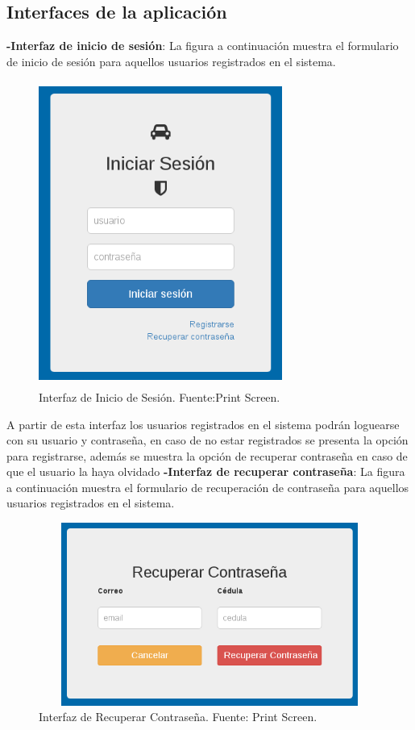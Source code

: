 \subsection{Interfaces de la aplicación}
\setlength{\parskip}{5mm}

\textbf{-Interfaz de inicio de sesión}: La figura a continuación muestra el formulario de inicio de sesión para aquellos usuarios registrados en el sistema.

\begin{figure}[H]
\begin{center}
	\includegraphics[width=8cm,height=10cm]{img/interfaces/inicio_sesion.png}
\end{center}
\caption{Interfaz de Inicio de Sesión. Fuente:Print Screen.}
\label{fig:interfaz_inicion_sesion}
\end{figure}

A partir de esta interfaz los usuarios registrados en el sistema podrán loguearse con su usuario y contraseña, en caso de no estar registrados se presenta la opción para registrarse, además se muestra la opción de recuperar contraseña en caso de que el usuario la haya olvidado
\newpage
\textbf{-Interfaz de recuperar contraseña}: La figura a continuación muestra el formulario de recuperación de contraseña para aquellos usuarios registrados en el sistema.


\begin{figure}[H]
\begin{center}
	\includegraphics[width=14cm,height=6cm]{img/interfaces/recuperar_contrasena.png}
\end{center}
\caption{Interfaz de Recuperar Contraseña. Fuente: Print Screen.}
\label{fig:interfaz_recuperar_contrasena}
\end{figure}

